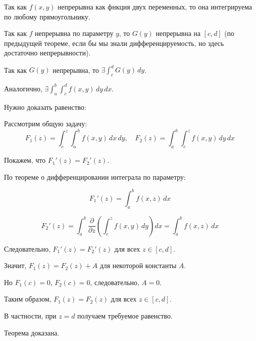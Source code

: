 \documentclass{article}
\begin{document}
Так как $f(x,y)$ непрерывна как фнкция двух переменных, то она интегрируема по любому прямоугольнику.

Так как $f$ непрерывна по параметру $y$, то $G(y)$ непрерывна на $[c,d]$ (по предыдущей теореме, если бы мы знали дифференцируемость, но здесь достаточно непрерывности).

Так как $G(y)$ непрерывна, то $\exists \int_c^d G(y)\,dy$.

Аналогично, $\exists \int_a^b \int_c^d f(x,y)\,dy\,dx$.

Нужно доказать равенство:

Рассмотрим общую задачу:
\[
F_1(z) = \int_c^z \int_a^b f(x,y)\,dx\,dy, \quad F_2(z) = \int_a^b \int_c^z f(x,y)\,dy\,dx
\]

Покажем, что $F_1'(z) = F_2'(z)$.

По теореме о дифференцировании интеграла по параметру:

\[
F_1'(z) = \int_a^b f(x,z)\,dx
\]

\[
F_2'(z) = \int_a^b \frac{\partial}{\partial z} \left( \int_c^z f(x,y)\,dy \right) dx = \int_a^b f(x,z)\,dx
\]

Следовательно, $F_1'(z) = F_2'(z)$ для всех $z \in [c,d]$.

Значит, $F_1(z) = F_2(z) + A$ для некоторой константы $A$.

Но $F_1(c) = 0$, $F_2(c) = 0$, следовательно, $A = 0$.

Таким образом, $F_1(z) = F_2(z)$ для всех $z \in [c,d]$.

В частности, при $z = d$ получаем требуемое равенство.

Теорема доказана.
\end{document}
